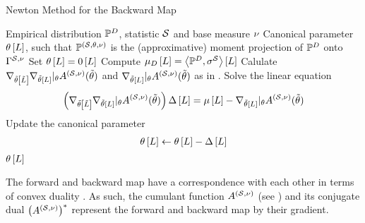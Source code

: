 \begin{algorithm}
    \caption{Newton Method for the Backward Map}\label{alg:newtonBackward}
    \begin{algorithmic}
        \Require Empirical distribution $\mathbb{P}^{D}$, statistic $\mathcal{S}$ and base measure $\nu$
        \Ensure Canonical parameter $\theta\left[L\right]$, such that $\mathbb{P}^{(\mathcal{S},\theta,\nu)}$ is the (approximative) moment projection of $\mathbb{P}^{D}$ onto $\Gamma^{\mathcal{S},\nu}$
        \iosepline
        \State Set $\theta\left[L\right]=0\left[L\right]$
        \State Compute $\mu_{D}\left[L\right]= \left\langle \mathbb{P}^{D},\sigma^{\mathcal{S}}\right\rangle \left[ L \right]$
            \State Calulate $\nabla_{\tilde{\theta}\left[\tilde{L}\right]}\nabla_{\tilde{\theta}\left[L\right]}|_{\theta} A^{(\mathcal{S},\nu)}(\tilde{\theta})$ and  $\nabla_{\tilde{\theta}\left[L\right]}|_{\theta} A^{(\mathcal{S},\nu)}(\tilde{\theta})$ as in . %
            \State Solve the linear equation
            \begin{align*}
                \left(\nabla_{\tilde{\theta}\left[\tilde{L}\right]}\nabla_{\tilde{\theta}\left[L\right]}|_{\theta} A^{(\mathcal{S},\nu)}(\tilde{\theta})\right)  \Delta\left[L\right]
                = \mu\left[L\right] - \nabla_{\tilde{\theta}\left[L\right]}|_{\theta} A^{(\mathcal{S},\nu)}(\tilde{\theta})
            \end{align*}
            \State Update the canonical parameter
            \begin{align*}
                \theta\left[L\right] \leftarrow \theta\left[L\right] - \Delta\left[L\right]
            \end{align*}
        \EndWhile
        \State \Return $\theta\left[L\right]$
    \end{algorithmic}
\end{algorithm}



%

The forward and backward map have a correspondence with each other in terms of convex duality \cite{rockafellar_convex_1997}.
As such, the cumulant function $A^{(\mathcal{S},\nu)}$ (see ) and its conjugate dual $\big(A^{(\mathcal{S},\nu)}\big)^*$ represent the forward and backward map by their gradient.


